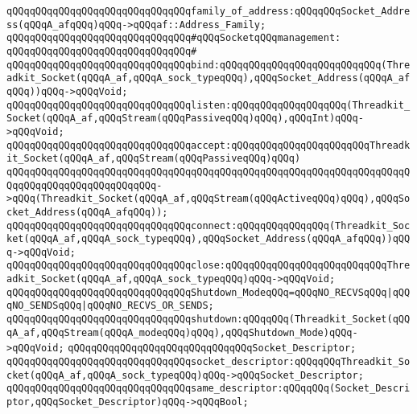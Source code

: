\verb|qQQqqQQqqQQqqQQqqQQqqQQqqQQqqQQqfamily_of_address:qQQqqQQqSocket_Address(qQQqA_afqQQq)qQQq->qQQqaf::Address_Family;|\newline
\newline
\verb|qQQqqQQqqQQqqQQqqQQqqQQqqQQqqQQq#qQQqSocketqQQqmanagement:|\newline
\verb|qQQqqQQqqQQqqQQqqQQqqQQqqQQqqQQq#|\newline
\verb|qQQqqQQqqQQqqQQqqQQqqQQqqQQqqQQqbind:qQQqqQQqqQQqqQQqqQQqqQQqqQQq(Threadkit_Socket(qQQqA_af,qQQqA_sock_typeqQQq),qQQqSocket_Address(qQQqA_afqQQq))qQQq->qQQqVoid;|\newline
\verb|qQQqqQQqqQQqqQQqqQQqqQQqqQQqqQQqlisten:qQQqqQQqqQQqqQQqqQQq(Threadkit_Socket(qQQqA_af,qQQqStream(qQQqPassiveqQQq)qQQq),qQQqInt)qQQq->qQQqVoid;|\newline
\verb|qQQqqQQqqQQqqQQqqQQqqQQqqQQqqQQqaccept:qQQqqQQqqQQqqQQqqQQqqQQqThreadkit_Socket(qQQqA_af,qQQqStream(qQQqPassiveqQQq)qQQq)|\newline
\verb|qQQqqQQqqQQqqQQqqQQqqQQqqQQqqQQqqQQqqQQqqQQqqQQqqQQqqQQqqQQqqQQqqQQqqQQqqQQqqQQqqQQqqQQqqQQqqQQq->qQQq(Threadkit_Socket(qQQqA_af,qQQqStream(qQQqActiveqQQq)qQQq),qQQqSocket_Address(qQQqA_afqQQq));|\newline
\verb|qQQqqQQqqQQqqQQqqQQqqQQqqQQqqQQqconnect:qQQqqQQqqQQqqQQq(Threadkit_Socket(qQQqA_af,qQQqA_sock_typeqQQq),qQQqSocket_Address(qQQqA_afqQQq))qQQq->qQQqVoid;|\newline
\verb|qQQqqQQqqQQqqQQqqQQqqQQqqQQqqQQqclose:qQQqqQQqqQQqqQQqqQQqqQQqqQQqThreadkit_Socket(qQQqA_af,qQQqA_sock_typeqQQq)qQQq->qQQqVoid;|\newline
\newline
\verb|qQQqqQQqqQQqqQQqqQQqqQQqqQQqqQQqShutdown_ModeqQQq=qQQqNO_RECVSqQQq|\verb#|qQQqNO_SENDSqQQq|qQQqNO_RECVS_OR_SENDS;#\newline
\verb|qQQqqQQqqQQqqQQqqQQqqQQqqQQqqQQqshutdown:qQQqqQQq(Threadkit_Socket(qQQqA_af,qQQqStream(qQQqA_modeqQQq)qQQq),qQQqShutdown_Mode)qQQq->qQQqVoid;|\newline
\newline
\verb|qQQqqQQqqQQqqQQqqQQqqQQqqQQqqQQqSocket_Descriptor;|\newline
\verb|qQQqqQQqqQQqqQQqqQQqqQQqqQQqqQQqsocket_descriptor:qQQqqQQqThreadkit_Socket(qQQqA_af,qQQqA_sock_typeqQQq)qQQq->qQQqSocket_Descriptor;|\newline
\verb|qQQqqQQqqQQqqQQqqQQqqQQqqQQqqQQqsame_descriptor:qQQqqQQq(Socket_Descriptor,qQQqSocket_Descriptor)qQQq->qQQqBool;|\newline
\newline
